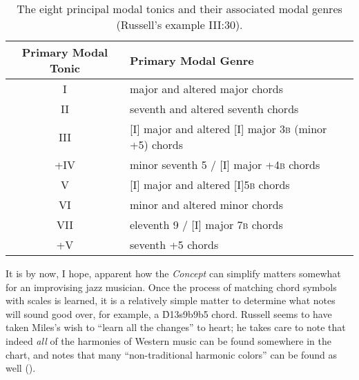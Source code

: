 \begin{table}[tbp]
  \centering
  \vspace{1em}
  \begin{tabular}{cl}
   Primary Modal Tonic & Primary Modal Genre \\
   \hline
   \rule[1em]{0ex}{1ex}%
   I    & major and altered major chords \\
   II   & seventh and altered seventh chords \\
   III  & [I] major and altered [I] major 3\textsc{b} (minor +5) chords \\
   +IV  & minor seventh \flat{}5 / [I] major +4\textsc{b} chords \\
   V    & [I] major and altered [I]5\textsc{b} chords \\
   VI   & minor and altered minor chords \\
   VII  & eleventh \flat{}9 / [I] major 7\textsc{b} chords \\
   +V   &  seventh +5 chords
  \end{tabular}
  \caption[The eight principal modal tonics and their associated modal
    genres.]{The eight principal modal tonics and their associated modal genres
    (Russell's example III:30).}
  \label{lcc:lydian-pmgs}
\end{table}

It is by now, I hope, apparent how the \emph{Concept} can simplify matters
somewhat for an improvising jazz musician. Once the process of matching chord
symbols with scales is learned, it is a relatively simple matter to determine
what notes will sound good over, for example, a \h{D13s9b9b5} chord. Russell
seems to have taken Miles's wish to ``learn all the changes'' to heart; he
takes care to note that indeed \emph{all} of the harmonies of Western music
can be found somewhere in the chart, and notes that many ``non-traditional
harmonic colors'' can be found as well ().

